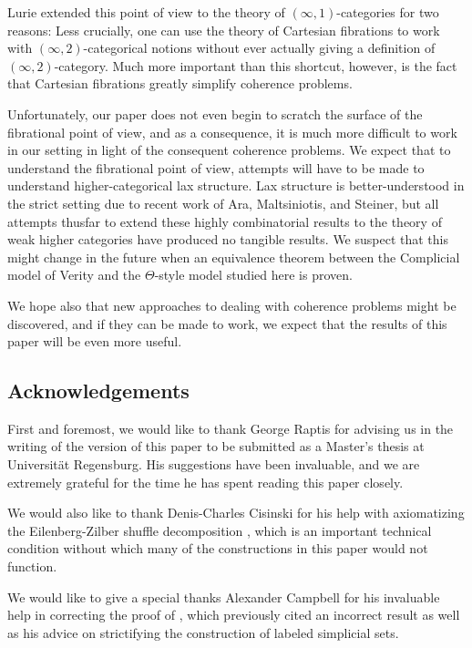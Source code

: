\documentclass[a4paper]{article}
\numberwithin{equation}{subsection}
\theoremstyle{plain}   %
\theoremstyle{definition}
\theoremstyle{remark}
\theoremstyle{plain}
\begin{document}
Lurie extended this point of view to the theory of \((\infty,1)\)-categories for two reasons: Less crucially, one can use the theory of Cartesian fibrations to work with \((\infty,2)\)-categorical notions without ever actually giving a definition of \((\infty,2)\)-category.  Much more important than this shortcut, however, is the fact that Cartesian fibrations greatly simplify coherence problems.  

Unfortunately, our paper does not even begin to scratch the surface of the fibrational point of view, and as a consequence, it is much more difficult to work in our setting in light of the consequent coherence problems.  We expect that to understand the fibrational point of view, attempts will have to be made to understand higher-categorical lax structure.  Lax structure is better-understood in the strict setting due to recent work of Ara, Maltsiniotis, and Steiner, but all attempts thusfar to extend these highly combinatorial results to the theory of weak higher categories have produced no tangible results.  We suspect that this might change in the future when an equivalence theorem between the Complicial model of Verity and the \(\Theta\)-style model studied here is proven.

We hope also that new approaches to dealing with coherence problems might be discovered, and if they can be made to work, we expect that the results of this paper will be even more useful.  

\subsection*{Acknowledgements} First and foremost, we would like to thank George Raptis for advising us in the writing of the version of this paper to be submitted as a Master's thesis at Universit\"at Regensburg.  His suggestions have been invaluable, and we are extremely grateful for the time he has spent reading this paper closely.

We would also like to thank Denis-Charles Cisinski for his help with axiomatizing the Eilenberg-Zilber shuffle decomposition , which is an important technical condition without which many of the constructions in this paper would not function.  

We would like to give a special thanks Alexander Campbell for his invaluable help in correcting the proof of , which previously cited an incorrect result as well as his advice on strictifying the construction of labeled simplicial sets.
\end{document}
